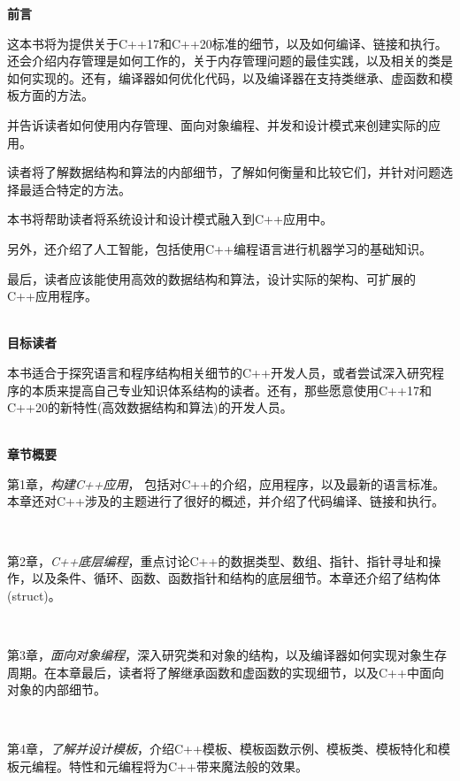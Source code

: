 \begin{flushright}
	\Huge\textbf{前言} \\
\end{flushright}

这本书将为提供关于C++17和C++20标准的细节，以及如何编译、链接和执行。还会介绍内存管理是如何工作的，关于内存管理问题的最佳实践，以及相关的类是如何实现的。还有，编译器如何优化代码，以及编译器在支持类继承、虚函数和模板方面的方法。 \par
并告诉读者如何使用内存管理、面向对象编程、并发和设计模式来创建实际的应用。 \par
读者将了解数据结构和算法的内部细节，了解如何衡量和比较它们，并针对问题选择最适合特定的方法。\par
本书将帮助读者将系统设计和设计模式融入到C++应用中。 \par
另外，还介绍了人工智能，包括使用C++编程语言进行机器学习的基础知识。 \par
最后，读者应该能使用高效的数据结构和算法，设计实际的架构、可扩展的C++应用程序。 \par

\hspace*{\fill} \\ %
\noindent\textbf{目标读者}\ \par
本书适合于探究语言和程序结构相关细节的C++开发人员，或者尝试深入研究程序的本质来提高自己专业知识体系结构的读者。还有，那些愿意使用C++17和C++20的新特性(高效数据结构和算法)的开发人员。 \par

\hspace*{\fill} \\ %
\noindent\textbf{章节概要}\ \par
\textsf{第1章}，\textit{构建C++应用}，
包括对C++的介绍，应用程序，以及最新的语言标准。本章还对C++涉及的主题进行了很好的概述，并介绍了代码编译、链接和执行。

\noindent\textbf{}\ \par
\textsf{第2章}，\textit{C++底层编程}，重点讨论C++的数据类型、数组、指针、指针寻址和操作，以及条件、循环、函数、函数指针和结构的底层细节。本章还介绍了结构体(struct)。

\noindent\textbf{}\ \par
\textsf{第3章}，\textit{面向对象编程}，深入研究类和对象的结构，以及编译器如何实现对象生存周期。在本章最后，读者将了解继承函数和虚函数的实现细节，以及C++中面向对象的内部细节。

\noindent\textbf{}\ \par
\textsf{第4章}，\textit{了解并设计模板}，介绍C++模板、模板函数示例、模板类、模板特化和模板元编程。特性和元编程将为C++带来魔法般的效果。

